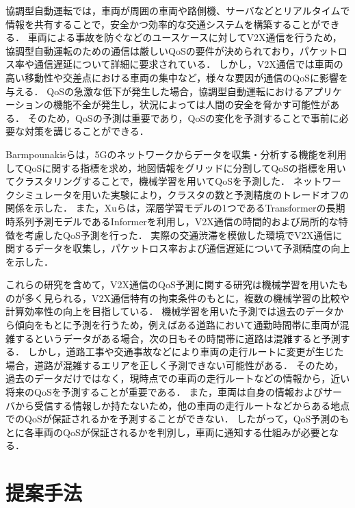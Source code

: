 \documentclass[a4paper,11pt,uplatex]{ujreport}
\begin{document}
  協調型自動運転では，車両が周囲の車両や路側機、サーバなどとリアルタイムで情報を共有することで，安全かつ効率的な交通システムを構築することができる．
  車両による事故を防ぐなどのユースケースに対してV2X通信を行うため，協調型自動運転のための通信は厳しいQoSの要件が決められており，パケットロス率や通信遅延について詳細に要求されている\cite{5GAA}．
  しかし，V2X通信では車両の高い移動性や交差点における車両の集中など，様々な要因が通信のQoSに影響を与える\cite{cause}．
  QoSの急激な低下が発生した場合，協調型自動運転におけるアプリケーションの機能不全が発生し，状況によっては人間の安全を脅かす可能性がある\cite{danger}．
  そのため，QoSの予測は重要であり，QoSの変化を予測することで事前に必要な対策を講じることができる．\par
  Barmpounakisらは，5Gのネットワークからデータを収集・分析する機能を利用してQoSに関する指標を求め，地図情報をグリッドに分割してQoSの指標を用いてクラスタリングすることで，機械学習を用いてQoSを予測した\cite{AI}．
  ネットワークシミュレータを用いた実験により，クラスタの数と予測精度のトレードオフの関係を示した．
  また，Xuらは，深層学習モデルの1つであるTransformer\cite{Transformer}の長期時系列予測モデルであるInformer\cite{Informer}を利用し，V2X通信の時間的および局所的な特徴を考慮したQoS予測を行った\cite{Informer-based}．
  実際の交通渋滞を模倣した環境でV2X通信に関するデータを収集し，パケットロス率および通信遅延について予測精度の向上を示した．\par
  これらの研究を含めて，V2X通信のQoS予測に関する研究は機械学習を用いたものが多く見られる，V2X通信特有の拘束条件のもとに，複数の機械学習の比較や計算効率性の向上を目指している．
  機械学習を用いた予測では過去のデータから傾向をもとに予測を行うため，例えばある道路において通勤時間帯に車両が混雑するというデータがある場合，次の日もその時間帯に道路は混雑すると予測する．
  しかし，道路工事や交通事故などにより車両の走行ルートに変更が生じた場合，道路が混雑するエリアを正しく予測できない可能性がある．
  そのため，過去のデータだけではなく，現時点での車両の走行ルートなどの情報から，近い将来のQoSを予測することが重要である．
  また，車両は自身の情報およびサーバから受信する情報しか持たないため，他の車両の走行ルートなどからある地点でのQoSが保証されるかを予測することができない．
  したがって，QoS予測のもとに各車両のQoSが保証されるかを判別し，車両に通知する仕組みが必要となる．

\chapter{提案手法}
\label{chap:提案手法}
\end{document}
